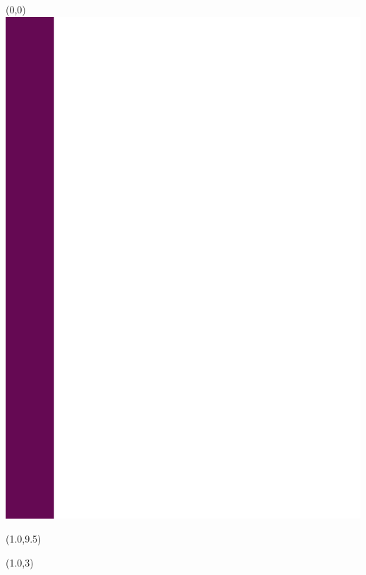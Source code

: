 \documentclass[a4paper]{article}
\newcommand{\NNT}{***}
\newcommand{\ecodocnum}{576} 																%
\begin{document}
\thispagestyle{empty}

\begin{textblock}{5}(0,0)
	\textblockcolour{}
	\includegraphics [scale=1]{1couverture/fig_1couverture/bande.png}
	\vspace{300mm}
\end{textblock}

\begin{textblock}{1}(1.0,9.5)
	\textblockcolour{}
	\Huge{}
\end{textblock}


\begin{textblock}{1}(1.0,3)
	\textblockcolour{}
	\Large{\rotatebox{90}{\color{white}{NNT : \NNT}}}
\end{textblock}
\end{document}

